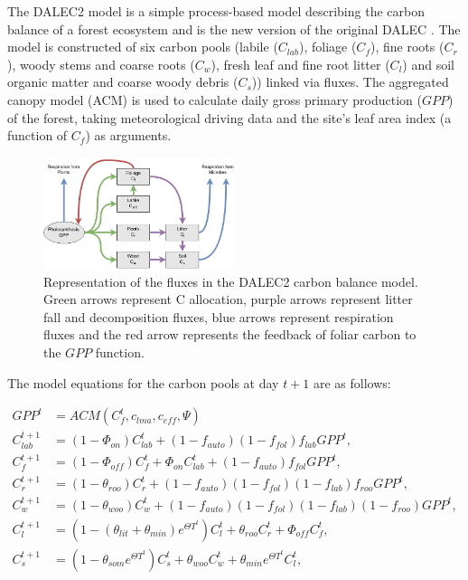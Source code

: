 \documentclass[11pt]{article}
\begin{document}
The DALEC2 model is a simple process-based model describing the carbon balance of a forest ecosystem \citep{Bloom2014} and is the new version of the original DALEC \citep{williams2005improved}. The model is constructed of six carbon pools (labile ($C_{lab}$), foliage ($C_f$), fine roots ($C_r$), woody stems and coarse roots ($C_w$), fresh leaf and fine root litter ($C_l$) and soil organic matter and coarse woody debris ($C_s$)) linked via fluxes. The aggregated canopy model (ACM) \citep{williams1997predicting} is used to calculate daily gross primary production ($GPP$) of the forest, taking meteorological driving data and the site's leaf area index (a function of $C_f$) as arguments.   

\begin{figure}[ht]
    \centering
    \includegraphics[width=0.5\textwidth]{Dalecdiagram.png}
    \caption{Representation of the fluxes in the DALEC2 carbon balance model. Green arrows represent C allocation, purple arrows represent litter fall and decomposition fluxes, blue arrows represent respiration fluxes and the red arrow represents the feedback of foliar carbon to the $GPP$ function.}
    \label{fig:DALEC_mod}
\end{figure}

The model equations for the carbon pools at day $t+1$ are as follows:

\begin{align}
GPP^{t} &= ACM(C_f^{t}, c_{lma}, c_{eff}, \Psi) \label{GPP}
\\C_{lab}^{t+1}&=(1-\Phi _{on})C_{lab}^{t}+(1-f_{auto})(1-f_{fol})f_{lab}GPP^{t}, \label{daleclab}
\\C_f^{t+1}&=(1-\Phi_{off})C_f^{t}+\Phi_{on}C_{lab}^{t}+(1-f_{auto})f_{fol}GPP^{t}, \label{dalec1}
\\C_r^{t+1}&=(1-\theta_{roo})C_r^{t}+(1-f_{auto})(1-f_{fol})(1-f_{lab})f_{roo}GPP^{t}, 
\\C_w^{t+1}&=(1-\theta_{woo})C_w^{t}+(1-f_{auto})(1-f_{fol})(1-f_{lab})(1-f_{roo})GPP^{t}, 
\\C_l^{t+1}&=(1-(\theta_{lit}+\theta_{min})e^{\Theta T^{t}})C_l^{t}+\theta_{roo}C_r^{t}+\Phi_{off}C_f^{t}, 
\\C_s^{t+1}&=(1-\theta_{som}e^{\Theta T^{t}})C_s^{t}+\theta_{woo}C_w^{t}+\theta_{min}e^{\Theta T^{t}}C_l^{t}, \label{dalec5}
\end{align}
\end{document}
